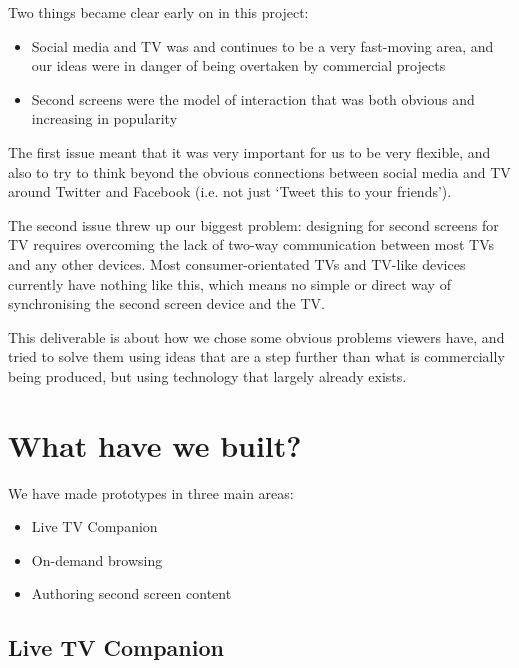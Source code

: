 \documentclass{notube}
\begin{document}
\noindent Two things became clear early on in this project:

\begin{itemize}
\item{Social media and TV was and continues to be a very fast-moving area, and our ideas were in danger of being overtaken by commercial projects}
\item{Second screens were the model of interaction that was both obvious and increasing in popularity}
\end{itemize}

The first issue meant that it was very important for us to be very flexible, and also to try to think beyond the obvious connections between social media and TV around Twitter and Facebook (i.e. not just `Tweet this to your friends'). 

The second issue threw up our biggest problem: designing for second screens for TV requires overcoming the lack of two-way communication between most TVs and any other devices. Most consumer-orientated TVs and TV-like devices currently have nothing like this, which means no simple or direct way of synchronising the second screen device and the TV. 

This deliverable is about how we chose some obvious problems viewers have, and tried to solve them using ideas that are a step further than what is commercially being produced, but using technology that largely already exists. 



\chapter{What have we built?}

We have made prototypes in three main areas:

\begin{itemize}
\item{Live TV Companion}
\item{On-demand browsing}
\item{Authoring second screen content}
\end{itemize}


\section{Live TV Companion}
\end{document}
